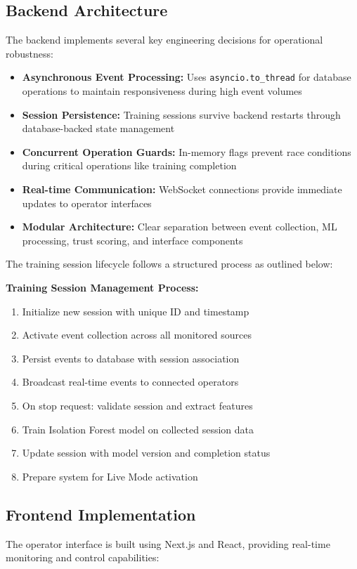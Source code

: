 \documentclass[conference]{IEEEtran}
\begin{document}
\subsection{Backend Architecture}
The backend implements several key engineering decisions for operational robustness:

\begin{itemize}[leftmargin=*]
  \item \textbf{Asynchronous Event Processing:} Uses \texttt{asyncio.to\_thread} for database operations to maintain responsiveness during high event volumes
  \item \textbf{Session Persistence:} Training sessions survive backend restarts through database-backed state management
  \item \textbf{Concurrent Operation Guards:} In-memory flags prevent race conditions during critical operations like training completion
  \item \textbf{Real-time Communication:} WebSocket connections provide immediate updates to operator interfaces
  \item \textbf{Modular Architecture:} Clear separation between event collection, ML processing, trust scoring, and interface components
\end{itemize}

The training session lifecycle follows a structured process as outlined below:

\textbf{Training Session Management Process:}
\begin{enumerate}
    \item Initialize new session with unique ID and timestamp
    \item Activate event collection across all monitored sources
    \item Persist events to database with session association
    \item Broadcast real-time events to connected operators
    \item On stop request: validate session and extract features
    \item Train Isolation Forest model on collected session data
    \item Update session with model version and completion status
    \item Prepare system for Live Mode activation
\end{enumerate}

\subsection{Frontend Implementation}
The operator interface is built using Next.js and React, providing real-time monitoring and control capabilities:
\end{document}
